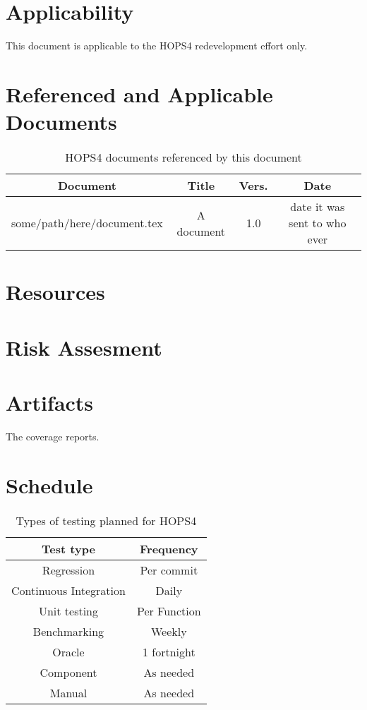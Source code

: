 \documentclass[notitlepage,letterpaper,pdftex,12pt,final]{article}
\numberwithin{equation}{section}
\begin{document}
\section{Applicability}
\label{sec:applicability}
This document is applicable to the HOPS4 redevelopment effort only.

\section{Referenced and Applicable Documents}
\label{sec:referenced-docs}
\begin{table}[h!]
\centering
 \begin{tabular}{||c c c c||} 
 \hline
 Document & Title & Vers. & Date \\ [0.5ex] 
 \hline\hline
 some/path/here/document.tex & A document & 1.0 & date it was sent to who ever \\ [1ex]
 \hline
 \end{tabular}
 \caption{HOPS4 documents referenced by this document}
 \label{table:1}
\end{table}

\section{Resources}
\label{sec:resources}

\section{Risk Assesment}
\label{sec:risk-assessment}

\section{Artifacts}
\label{sec:artifacts}
The coverage reports.

\section{Schedule}
\label{sec:schedule}
\begin{table}[h!]
\centering
 \begin{tabular}{||c c||} 
 \hline
 Test type & Frequency \\ [0.5ex] 
 \hline\hline
 Regression &  Per commit \\ 
 Continuous Integration & Daily \\
 Unit testing & Per Function \\ 
 Benchmarking & Weekly \\
 Oracle  & 1 fortnight \\
 Component & As needed \\ 
 Manual & As needed \\ [1ex]
 \hline
 \end{tabular}
 \caption{Types of testing planned for HOPS4}
 \label{table:2}
\end{table}
\end{document}
